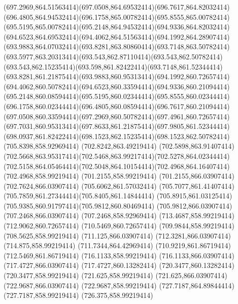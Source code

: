 {{	\curveto(697.2969,864.51563414)(697.0508,864.69532414)(696.7617,864.82032414)
	\curveto(696.4805,864.94532414)(696.1758,865.00782414)(695.8555,865.00782414)
	\curveto(695.5195,865.00782414)(695.2148,864.94532414)(694.9336,864.82032414)
	\curveto(694.6523,864.69532414)(694.4062,864.51563414)(694.1992,864.28907414)
	\curveto(693.9883,864.07032414)(693.8281,863.80860414)(693.7148,863.50782414)
	\curveto(693.5977,863.20313414)(693.543,862.87110414)(693.543,862.50782414)
	\curveto(693.543,862.15235414)(693.598,861.82422414)(693.7148,861.52344414)
	\curveto(693.8281,861.21875414)(693.9883,860.95313414)(694.1992,860.72657414)
	\curveto(694.4062,860.50782414)(694.6523,860.33594414)(694.9336,860.21094414)
	\curveto(695.2148,860.08594414)(695.5195,860.02344414)(695.8555,860.02344414)
	\curveto(696.1758,860.02344414)(696.4805,860.08594414)(696.7617,860.21094414)
	\curveto(697.0508,860.33594414)(697.2969,860.50782414)(697.4961,860.72657414)
	\curveto(697.7031,860.95313414)(697.8633,861.21875414)(697.9805,861.52344414)
	\curveto(698.0937,861.82422414)(698.1523,862.15235414)(698.1523,862.50782414)
	\closepath
	\moveto(705.8398,858.92969414)
	\lineto(702.8242,863.49219414)
	\lineto(702.5898,863.91407414)
	\curveto(702.5668,863.95317414)(702.5468,863.99217414)(702.5278,864.02344414)
	\curveto(702.5158,864.05464414)(702.5048,864.10154414)(702.4968,864.16407414)
	\lineto(702.4968,858.99219414)
	\lineto(701.2155,858.99219414)
	\lineto(701.2155,866.03907414)
	\lineto(702.7624,866.03907414)
	\lineto(705.6062,861.57032414)
	\curveto(705.7077,861.41407414)(705.7859,861.27344414)(705.8405,861.14844414)
	\curveto(705.8915,861.03125414)(705.9385,860.91797414)(705.9812,860.80469414)
	\lineto(705.9812,866.03907414)
	\lineto(707.2468,866.03907414)
	\lineto(707.2468,858.92969414)
	\closepath
	\moveto(713.4687,858.99219414)
	\lineto(712.9062,860.72657414)
	\lineto(710.5469,860.72657414)
	\lineto(709.9844,858.99219414)
	\lineto(708.5625,858.99219414)
	\lineto(711.125,866.03907414)
	\lineto(712.3281,866.03907414)
	\lineto(714.875,858.99219414)
	\closepath
	\moveto(711.7344,864.42969414)
	\lineto(710.9219,861.86719414)
	\lineto(712.5469,861.86719414)
	\closepath
	\moveto(716.1133,858.99219414)
	\lineto(716.1133,866.03907414)
	\lineto(717.4727,866.03907414)
	\lineto(717.4727,860.13282414)
	\lineto(720.3477,860.13282414)
	\lineto(720.3477,858.99219414)
	\closepath
	\moveto(721.625,858.99219414)
	\lineto(721.625,866.03907414)
	\lineto(722.9687,866.03907414)
	\lineto(722.9687,858.99219414)
	\closepath
	\moveto(727.7187,864.89844414)
	\lineto(727.7187,858.99219414)
	\lineto(726.375,858.99219414)
}}

